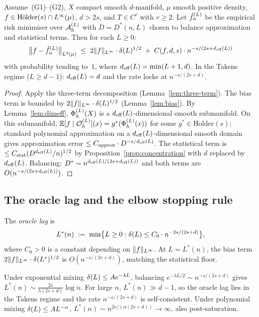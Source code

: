 \begin{proposition}
\label{prop:piecewise-rate}
Assume~(G1)--(G2), $X$ compact smooth $d$-manifold, $\mu$ smooth positive
density, $f \in \mathrm{H\ddot{o}lder}(s) \cap L^{\infty}(\mu)$, $d > 2s$,
and $T \in C^r$ with $r \geq 2$.
Let $\hat{f}_n^{(L)}$ be the empirical risk minimiser over $\mathcal{A}_h^{(L)}$ with $D = D^*(n,L)$
chosen to balance approximation and statistical terms.
Then for each $L \geq 0$:
\[
  \bigl\|f - \hat{f}_n^{(L)}\bigr\|_{L^{2}(\mu)}
  \;\leq\;
  2\|f\|_{L^{\infty}} \cdot \delta(L)^{1/2}
  \;+\;
  C(f,d,s) \cdot n^{-s/(2s+d_{\mathrm{eff}}(L))}
\]
with probability tending to~$1$, where $d_{\mathrm{eff}}(L) = \min(L+1,d)$.
In the Takens regime ($L \geq d-1$): $d_{\mathrm{eff}}(L) = d$ and the rate locks at
$n^{-s/(2s+d)}$.
\end{proposition}

\begin{proof}
Apply the three-term decomposition (Lemma~\ref{lem:three-term}).
The bias term is bounded by $2\|f\|_{L^{\infty}} \cdot \delta(L)^{1/2}$
(Lemma~\ref{lem:bias}).
By Lemma~\ref{lem:dimeff}, $\Phi_h^{(L)}(X)$ is a $d_{\mathrm{eff}}(L)$-dimensional smooth
submanifold.
On this submanifold, $\mathbb{E}[f \mid \mathcal{O}_h^{(L)}](x) = g^*(\Phi_h^{(L)}(x))$ for some
$g^* \in \mathrm{H\ddot{o}lder}(s)$; standard polynomial approximation on a
$d_{\mathrm{eff}}(L)$-dimensional smooth domain gives approximation error
$\leq C_{\mathrm{approx}} \cdot D^{-s/d_{\mathrm{eff}}(L)}$.
The statistical term is $\leq C_{\mathrm{stat}}(D^{d_{\mathrm{eff}}(L)}/n)^{1/2}$ by
Proposition~\ref{prop:concentration} with $d$ replaced by $d_{\mathrm{eff}}(L)$.
Balancing: $D^* \sim n^{d_{\mathrm{eff}}(L)/(2s+d_{\mathrm{eff}}(L))}$ and both terms are
$O(n^{-s/(2s+d_{\mathrm{eff}}(L))})$.
\end{proof}

\subsection{The oracle lag and the elbow stopping rule}

\begin{definition}
\label{def:oracle-lag}
The \emph{oracle lag} is
\[
  L^*(n) \;:=\; \min\bigl\{L \geq 0 : \delta(L) \leq C_0 \cdot n^{-2s/(2s+d)}\bigr\},
\]
where $C_0 > 0$ is a constant depending on $\|f\|_{L^{\infty}}$.
At $L = L^*(n)$, the bias term $2\|f\|_{L^{\infty}} \cdot \delta(L^*)^{1/2}$
is $O(n^{-s/(2s+d)})$, matching the statistical floor.
\end{definition}

\begin{remark}
Under exponential mixing $\delta(L) \leq A e^{-\lambda L}$, balancing
$e^{-\lambda L/2} \sim n^{-s/(2s+d)}$ gives $L^*(n) \sim \frac{2s}{\lambda(2s+d)}\log n$.
For large $n$, $L^*(n) \gg d-1$, so the oracle lag lies in the Takens regime
and the rate $n^{-s/(2s+d)}$ is self-consistent.
Under polynomial mixing $\delta(L) \leq A L^{-\alpha}$, $L^*(n) \sim n^{2s/(\alpha(2s+d))} \to \infty$,
also post-saturation.
\end{remark}

